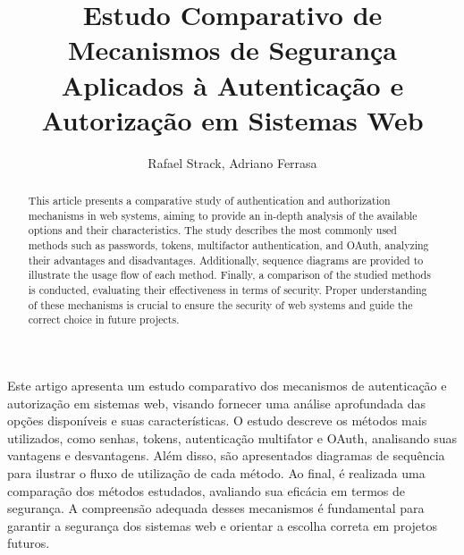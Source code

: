 \documentclass[12pt]{article}
\title{Estudo Comparativo de Mecanismos de Segurança Aplicados à Autenticação e Autorização em 
Sistemas Web}
\author{Rafael Strack\inst{1}, Adriano Ferrasa\inst{1}}
\begin{document}
\maketitle

\begin{abstract}
  This article presents a comparative study of authentication and authorization mechanisms in web
  systems, aiming to provide an in-depth analysis of the available options and their
  characteristics. The study describes the most commonly used methods such as passwords, tokens,
  multifactor authentication, and OAuth, analyzing their advantages and disadvantages. Additionally,
  sequence diagrams are provided to illustrate the usage flow of each method. Finally, a comparison
  of the studied methods is conducted, evaluating their effectiveness in terms of security. Proper
  understanding of these mechanisms is crucial to ensure the security of web systems and guide the
  correct choice in future projects.
\end{abstract}

\begin{resumo}
  Este artigo apresenta um estudo comparativo dos mecanismos de autenticação e autorização em
  sistemas web, visando fornecer uma análise aprofundada das opções disponíveis e suas
  características. O estudo descreve os métodos mais utilizados, como senhas, tokens, autenticação
  multifator e OAuth, analisando suas vantagens e desvantagens. Além disso, são apresentados
  diagramas de sequência para ilustrar o fluxo de utilização de cada método. Ao final, é
  realizada uma comparação dos métodos estudados, avaliando sua eficácia em termos de segurança. A
  compreensão adequada desses mecanismos é fundamental para garantir a segurança dos sistemas web e
  orientar a escolha correta em projetos futuros.
\end{resumo}











% 



% 






\end{document}
